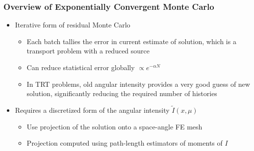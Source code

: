 \documentclass[xcolor=dvipsnames,handout,hyperref={pdfpagelabels=false}]{beamer}
\newcommand{\colb}[1]{{\color{blue} #1}}
\newcommand{\colr}[1]{{\color{red} #1}}
\newlength{\wideitemsep}
\let\olditem\item
\renewcommand{\item}{\setlength{\itemsep}{\wideitemsep}\olditem}
\begin{document}
\begin{frame}
    \frametitle{Overview of Exponentially Convergent Monte Carlo}
    \begin{itemize}
        \item Iterative form of residual Monte Carlo
      \begin{itemize}
          \item Each batch tallies the \colb{error} in current estimate of solution, which
            is a transport problem with a reduced source
    \item Can reduce statistical error \colb{globally} $\propto e^{-\alpha N}$
           \item In TRT problems, old angular intensity provides a very good guess of new
               solution, significantly reducing the required number of histories
\end{itemize}
     \end{itemize}
    \begin{minipage}{0.6\linewidth}
        \vspace{-2.0in}
     \begin{itemize}
        \item Requires a \colr{discretized} form of the angular intensity $\tilde I(x,\mu)$
            \begin{itemize}
                \item Use \colb{projection} of the solution onto a space-angle FE mesh
                \item Projection computed using path-length estimators of moments of $I$
    \end{itemize}
    \end{itemize}
    \end{minipage}
    \begin{minipage}[t]{0.3\linewidth}
        \centering
    \end{minipage}%
\end{frame}
\end{document}
